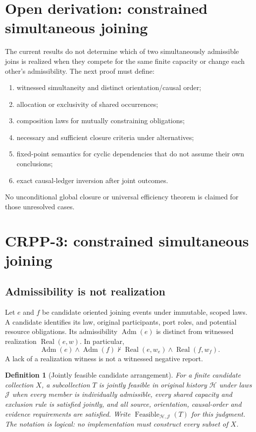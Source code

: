 \documentclass[11pt]{article}
\newtheorem{definition}{Definition}[section]
\newcommand{\Adm}{\operatorname{Adm}}
\newcommand{\Real}{\operatorname{Real}}
\newcommand{\Hist}{\mathcal{H}}
\newcommand{\Laws}{\mathcal{J}}
\begin{document}
\section{Open derivation: constrained simultaneous joining}
The current results do not determine which of two simultaneously
admissible joins is realized when they compete for the same finite
capacity or change each other's admissibility.
The next proof must define:
\begin{enumerate}[label=(\roman*)]
\item witnessed simultaneity and distinct orientation/causal order;
\item allocation or exclusivity of shared occurrences;
\item composition laws for mutually constraining obligations;
\item necessary and sufficient closure criteria under alternatives;
\item fixed-point semantics for cyclic dependencies that do not assume their own conclusions;
\item exact causal-ledger inversion after joint outcomes.
\end{enumerate}
No unconditional global closure or universal efficiency theorem is
claimed for those unresolved cases.


\section{CRPP-3: constrained simultaneous joining}
\label{sec:crpp3}
\subsection{Admissibility is not realization}
Let $e$ and $f$ be candidate oriented joining events under immutable,
scoped laws. A candidate identifies its law, original participants,
port roles, and potential resource obligations. Its admissibility
$\Adm(e)$ is distinct from witnessed realization $\Real(e,w)$.
In particular,
\[
\Adm(e)\land\Adm(f)\not\vdash\Real(e,w_e)\land\Real(f,w_f).
\]
A lack of a realization witness is not a witnessed negative report.

\begin{definition}[Jointly feasible candidate arrangement]
For a finite candidate collection $X$, a subcollection $T$
is jointly feasible in original history $\Hist$ under laws $\Laws$
when every member is individually admissible, every shared capacity
and exclusion rule is satisfied jointly, and all source, orientation,
causal-order and evidence requirements are satisfied. Write
$\operatorname{Feasible}_{\Hist,\Laws}(T)$ for this judgment.
The notation is logical: no implementation must construct every
subset of $X$.
\end{definition}
\end{document}
